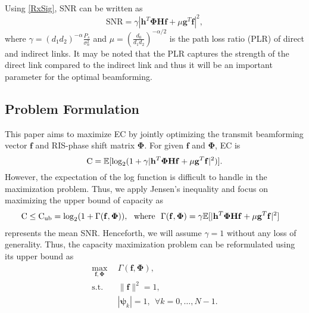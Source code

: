 \documentclass[journal,draftclsnofoot,onecolumn,12pt]{IEEEtran}
\begin{document}
Using \eqref{RxSig}, SNR can be written as
\begin{equation}
    \text{SNR} = \gamma |\mathbf{h}^T\mathbf{\Phi Hf} + \mu \mathbf{g}^T\mathbf{f}|^2,\label{SNR}
\end{equation}
where $\gamma = (d_1d_2)^{-\alpha}\frac{P_s}{\sigma_n^2} $ and $\mu = (\frac{d_0}{d_1d_2})^{-\alpha/2}$ is the path loss ratio (PLR) of direct and indirect links. It may be noted that the PLR captures the strength of the direct link compared to the indirect link and thus it will be an important parameter for the optimal beamforming. %
\vspace{-.4cm}\subsection{Problem Formulation}\label{prob from}\vspace{-.2cm}
This paper aims to maximize EC by jointly optimizing the transmit beamforming vector $\mathbf{f}$  and  RIS-phase shift matrix $\mathbf{\Phi}$. For given $\mathbf{f}$ and $\mathbf{\Phi}$, EC  is 
\begin{equation*}
    {\rm C} = \mathbb{E}[\log_2(1 + \gamma|\mathbf{h}^T\mathbf{\Phi Hf} + \mu \mathbf{g}^T\mathbf{f}|^2)].
\end{equation*}
However, the expectation of the log function is difficult to handle in the maximization problem. Thus, we apply Jensen's inequality %
and focus on maximizing the upper bound of capacity as 
\begin{align}
  {\rm C}\leq{\rm C_{ub}} &=  \log_2(1 + \Gamma(\mathbf{f},\mathbf{\Phi})),\text{~~where~~}
  \Gamma(\mathbf{f},\mathbf{\Phi}) = \gamma\mathbb{E}[|\mathbf{h}^T\mathbf{\Phi Hf} + \mu \mathbf{g}^T\mathbf{f}|^2]\label{obj_fun}
\end{align}
represents the mean {\rm SNR}. Henceforth, we will assume $\gamma=1$ without any loss of generality. Thus, the capacity maximization problem can be reformulated using its upper bound as
\begin{subequations}
\begin{align}
    \max_{\mathbf{f},\mathbf{\Phi}} ~~&  \Gamma(\mathbf{f},\mathbf{\Phi}),\label{objective}\\
   \text{s.t.} ~~& \|\mathbf{f}\|^2 = 1,\label{constraint_f}\\
    &|\boldsymbol{\psi}_k| = 1, ~~ \forall k = 0,\ldots,N-1.\label{constraint_phi}%
\end{align}
\label{optimization problem}%
\end{subequations}
\end{document}
